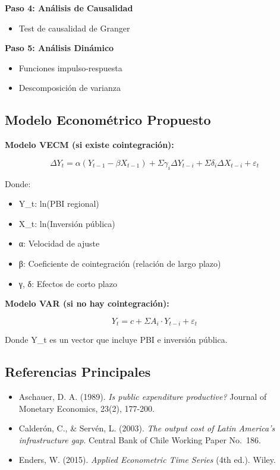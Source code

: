 \documentclass[
  man,
  floatsintext,
  longtable,
  a4paper,
  nolmodern,
  notxfonts,
  notimes,
  12pt,
  colorlinks=true,linkcolor=blue,citecolor=blue,urlcolor=blue]{apa7}
\providecommand{\tightlist}{%
  \setlength{\itemsep}{0pt}\setlength{\parskip}{0pt}}
\begin{document}
\textbf{Paso 4: Análisis de Causalidad}

\begin{itemize}
\tightlist
\item
  Test de causalidad de Granger
\end{itemize}

\textbf{Paso 5: Análisis Dinámico}

\begin{itemize}
\tightlist
\item
  Funciones impulso-respuesta
\item
  Descomposición de varianza
\end{itemize}

\subsection{Modelo Econométrico
Propuesto}\label{modelo-economuxe9trico-propuesto-1}

\textbf{Modelo VECM (si existe cointegración):}

\[
ΔY_t = α(Y_{t-1} - βX_{t-1}) + Σγ_iΔY_{t-i} + Σδ_iΔX_{t-i} + ε_t
\]

Donde:

\begin{itemize}
\tightlist
\item
  Y\_t: ln(PBI regional)
\item
  X\_t: ln(Inversión pública)
\item
  α: Velocidad de ajuste
\item
  β: Coeficiente de cointegración (relación de largo plazo)
\item
  γ, δ: Efectos de corto plazo
\end{itemize}

\textbf{Modelo VAR (si no hay cointegración):}

\[
Y_t = c + ΣA_i·Y_{t-i} + ε_t
\]

Donde Y\_t es un vector que incluye PBI e inversión pública.

\subsection{Referencias Principales}\label{referencias-principales-4}

\begin{itemize}
\tightlist
\item
  Aschauer, D. A. (1989). \emph{Is public expenditure productive?}
  Journal of Monetary Economics, 23(2), 177-200.
\item
  Calderón, C., \& Servén, L. (2003). \emph{The output cost of Latin
  America's infrastructure gap}. Central Bank of Chile Working Paper
  No.~186.
\item
  Enders, W. (2015). \emph{Applied Econometric Time Series} (4th ed.).
  Wiley.
\end{itemize}
\end{document}
